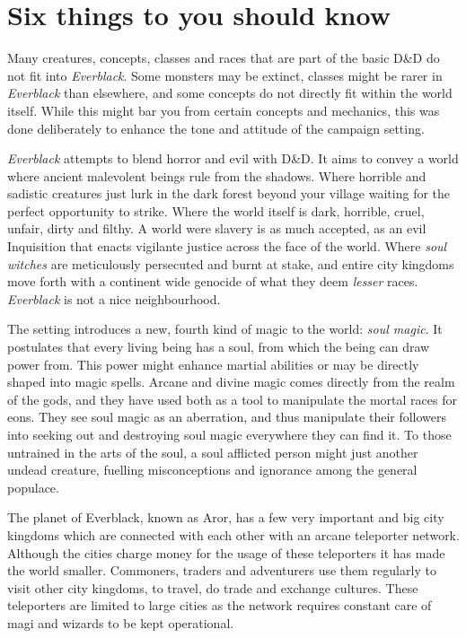 \section*{Six things to you should know}

\begin{enumerate}
  Many creatures, concepts, classes and
 races that are part of the basic D\&D do not fit into \emph{Everblack}. Some
 monsters may be extinct, classes might be rarer in \emph{Everblack} than
 elsewhere, and some concepts do not directly fit within the world
 itself. While this might bar you from certain concepts and mechanics, this
 was done deliberately to enhance the tone and attitude of the campaign
 setting.

  \emph{Everblack} attempts to blend horror and evil with
 D\&D. It aims to convey a world where ancient malevolent beings rule from the
 shadows. Where horrible and sadistic creatures just lurk in the dark forest
 beyond your village waiting for the perfect opportunity to strike. Where the
 world itself is dark, horrible, cruel, unfair, dirty and filthy. A world were
 slavery is as much accepted, as an evil Inquisition that enacts vigilante
 justice across the face of the world. Where \emph{soul witches} are
 meticulously persecuted and burnt at stake, and entire city kingdoms move
 forth with a continent wide genocide of what they deem \emph{lesser} races.
 \emph{Everblack} is not a nice neighbourhood.

  The setting introduces a new, fourth kind of magic to the
 world: \emph{soul magic}. It postulates that every living being has a soul,
 from which the being can draw power from. This power might enhance martial
 abilities or may be directly shaped into magic spells. Arcane and divine
 magic comes directly from the realm of the gods, and they have used both as a
 tool to manipulate the mortal races for eons. They see soul magic as an
 aberration, and thus manipulate their followers into seeking out and
 destroying soul magic everywhere they can find it. To those untrained in the
 arts of the soul, a soul afflicted person might just another undead creature,
 fuelling misconceptions and ignorance among the general populace.

  The planet of Everblack, known as Aror, has a
 few very important and big city kingdoms which are connected with each other
 with an arcane teleporter network. Although the cities charge money for the
 usage of these teleporters it has made the world smaller. Commoners, traders
 and adventurers use them regularly to visit other city kingdoms, to travel,
 do trade and exchange cultures. These teleporters are limited to large cities
 as the network requires constant care of magi and wizards to be kept
 operational.


\end{enumerate}
